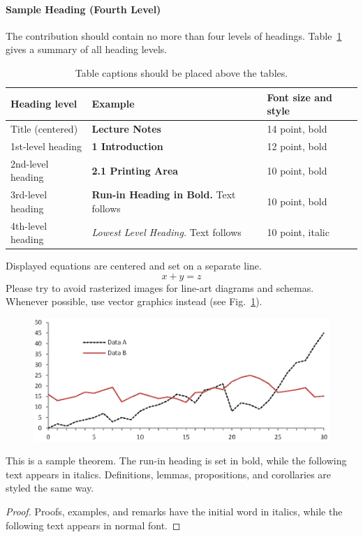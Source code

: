 \documentclass[runningheads]{llncs}
\begin{document}
\paragraph{Sample Heading (Fourth Level)}
The contribution should contain no more than four levels of
headings. Table~\ref{tab1} gives a summary of all heading levels.

\begin{table}
\caption{Table captions should be placed above the
tables.}\label{tab1}
\begin{tabular}{|l|l|l|}
\hline
Heading level &  Example & Font size and style\\
\hline
Title (centered) &  {\Large\bfseries Lecture Notes} & 14 point, bold\\
1st-level heading &  {\large\bfseries 1 Introduction} & 12 point, bold\\
2nd-level heading & {\bfseries 2.1 Printing Area} & 10 point, bold\\
3rd-level heading & {\bfseries Run-in Heading in Bold.} Text follows & 10 point, bold\\
4th-level heading & {\itshape Lowest Level Heading.} Text follows & 10 point, italic\\
\hline
\end{tabular}
\end{table}


\noindent Displayed equations are centered and set on a separate
line.
\begin{equation}
x + y = z
\end{equation}
Please try to avoid rasterized images for line-art diagrams and
schemas. Whenever possible, use vector graphics instead (see
Fig.~\ref{fig1}).

\begin{figure}
\includegraphics[width=\textwidth]{fig1.eps}
\label{fig1}
\end{figure}

\begin{theorem}
This is a sample theorem. The run-in heading is set in bold, while
the following text appears in italics. Definitions, lemmas,
propositions, and corollaries are styled the same way.
\end{theorem}
%
%
\begin{proof}
Proofs, examples, and remarks have the initial word in italics,
while the following text appears in normal font.
\end{proof}

%
%
%


%
%
\end{document}
